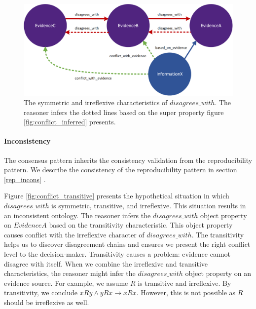 \begin{figure}[H]
\centering
  \includegraphics[width=13cm]{../../Images/04_Contribution/04_Conflict_Characteristics.png}
  \caption{The symmetric and irreflexive characteristics of $disagrees\_with$. The reasoner infers the dotted lines based on the super property figure \ref{fig:conflict_inferred} presents.}
  \label{fig:conflict_irreflexive}
\end{figure}

\paragraph{Inconsistency}
The consensus pattern inherits the consistency validation from the reproducibility pattern. We describe the consistency of the reproducibility pattern in section \ref{rep_incons} .

Figure \ref{fig:conflict_transitive} presents the hypothetical situation in which $disagrees\_with$ is symmetric, transitive, and irreflexive. This situation results in an inconsistent ontology. The reasoner infers the $disagrees\_with$ object property on $EvidenceA$ based on the transitivity characteristic. This object property causes conflict with the irreflexive character of $disagrees\_with$. The transitivity helps us to discover disagreement chains and ensures we present the right conflict level to the decision-maker. Transitivity causes a problem: evidence cannot disagree with itself. When we combine the irreflexive and transitive characteristics, the reasoner might infer the $disagrees\_with$ object property on an evidence source. For example, we assume $R$ is transitive and irreflexive. By transitivity, we conclude $xRy \land yRx \rightarrow xRx$. However, this is not possible as $R$ should be irreflexive as well.

